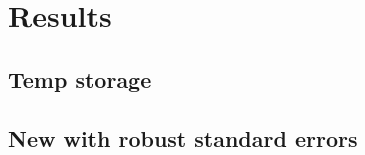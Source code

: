 
\chapter{Results}

\cleardoublepage

\section{Temp storage}


\section{New with robust standard errors}


